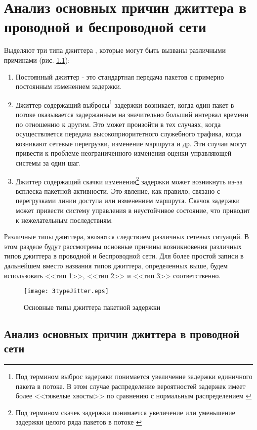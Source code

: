 \chapter{Анализ основных причин джиттера в проводной и беспроводной сети} \label{chapt2}
Выделяют три типа джиттера \cite{clark}, которые могут быть вызваны различными причинами (рис. \ref{img:3typeJitter}):
\begin{enumerate}
  \item Постоянный джиттер - это стандартная передача пакетов с примерно постоянным изменением задержки.
  \item Джиттер содержащий выбросы\footnote{Под термином выброс задержки понимается увеличение задержки единичного пакета в потоке. В этом случае распределение вероятностей задержек имеет более <<тяжелые хвосты>>  по сравнению с нормальным распределением \cite{Klekis} } задержки возникает, когда один пакет в потоке оказывается задержанным на значительно больший интервал времени по отношению к другим. Это может произойти в тех случаях, когда осуществляется передача высокоприоритетного служебного трафика, когда возникают сетевые перегрузки, изменение маршрута и др. Эти случаи могут привести к проблеме неограниченного изменения оценки управляющей системы за один шаг.
  \item Джиттер содержащий скачки изменения\footnote{Под термином скачек задержки понимается увеличение или уменьшение задержки целого ряда пакетов в потоке \cite{clark} } задержки может возникнуть из-за всплеска пакетной активности. Это явление, как правило, связано с перегрузками линии доступа или изменением маршрута. Скачок задержки может привести систему управления в неустойчивое состояние, что приводит к нежелательным последствиям.
\end{enumerate}


Различные типы джиттера, являются следствием различных сетевых ситуаций. В этом разделе будут рассмотрены основные причины возникновения различных типов джиттера в проводной и беспроводной сети. Для более простой записи в дальнейшем вместо названия типов джиттера, определенных выше, будем использовать <<тип 1>>, <<тип 2>> и <<тип 3>> соответственно.
\clearpage
\begin{figure} [!h] 
  \center
\texttt{[image: 3typeJitter.eps]}
  \caption{Основные типы джиттера пакетной задержки} 
  \label{img:3typeJitter}  
\end{figure}


\section{Анализ основных причин джиттера в проводной сети} \label{sect2_1}


